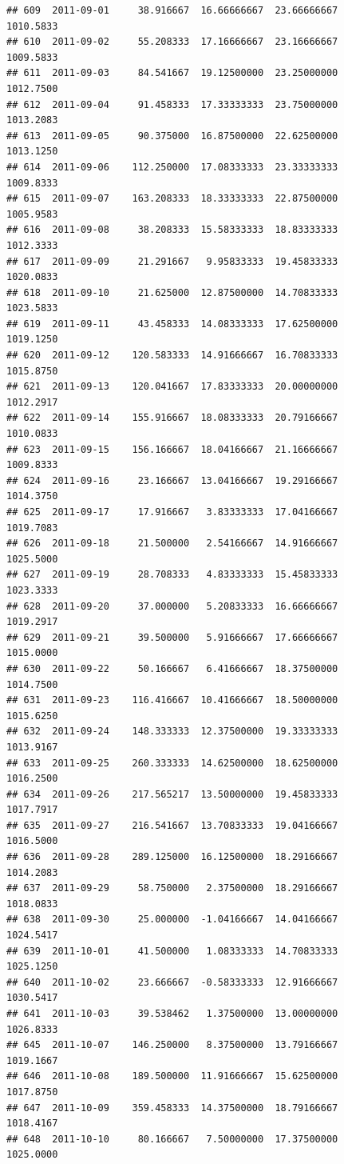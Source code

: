 \documentclass[
]{article}
\begin{document}
\begin{verbatim}
## 609  2011-09-01     38.916667  16.66666667  23.66666667    1010.5833
## 610  2011-09-02     55.208333  17.16666667  23.16666667    1009.5833
## 611  2011-09-03     84.541667  19.12500000  23.25000000    1012.7500
## 612  2011-09-04     91.458333  17.33333333  23.75000000    1013.2083
## 613  2011-09-05     90.375000  16.87500000  22.62500000    1013.1250
## 614  2011-09-06    112.250000  17.08333333  23.33333333    1009.8333
## 615  2011-09-07    163.208333  18.33333333  22.87500000    1005.9583
## 616  2011-09-08     38.208333  15.58333333  18.83333333    1012.3333
## 617  2011-09-09     21.291667   9.95833333  19.45833333    1020.0833
## 618  2011-09-10     21.625000  12.87500000  14.70833333    1023.5833
## 619  2011-09-11     43.458333  14.08333333  17.62500000    1019.1250
## 620  2011-09-12    120.583333  14.91666667  16.70833333    1015.8750
## 621  2011-09-13    120.041667  17.83333333  20.00000000    1012.2917
## 622  2011-09-14    155.916667  18.08333333  20.79166667    1010.0833
## 623  2011-09-15    156.166667  18.04166667  21.16666667    1009.8333
## 624  2011-09-16     23.166667  13.04166667  19.29166667    1014.3750
## 625  2011-09-17     17.916667   3.83333333  17.04166667    1019.7083
## 626  2011-09-18     21.500000   2.54166667  14.91666667    1025.5000
## 627  2011-09-19     28.708333   4.83333333  15.45833333    1023.3333
## 628  2011-09-20     37.000000   5.20833333  16.66666667    1019.2917
## 629  2011-09-21     39.500000   5.91666667  17.66666667    1015.0000
## 630  2011-09-22     50.166667   6.41666667  18.37500000    1014.7500
## 631  2011-09-23    116.416667  10.41666667  18.50000000    1015.6250
## 632  2011-09-24    148.333333  12.37500000  19.33333333    1013.9167
## 633  2011-09-25    260.333333  14.62500000  18.62500000    1016.2500
## 634  2011-09-26    217.565217  13.50000000  19.45833333    1017.7917
## 635  2011-09-27    216.541667  13.70833333  19.04166667    1016.5000
## 636  2011-09-28    289.125000  16.12500000  18.29166667    1014.2083
## 637  2011-09-29     58.750000   2.37500000  18.29166667    1018.0833
## 638  2011-09-30     25.000000  -1.04166667  14.04166667    1024.5417
## 639  2011-10-01     41.500000   1.08333333  14.70833333    1025.1250
## 640  2011-10-02     23.666667  -0.58333333  12.91666667    1030.5417
## 641  2011-10-03     39.538462   1.37500000  13.00000000    1026.8333
## 645  2011-10-07    146.250000   8.37500000  13.79166667    1019.1667
## 646  2011-10-08    189.500000  11.91666667  15.62500000    1017.8750
## 647  2011-10-09    359.458333  14.37500000  18.79166667    1018.4167
## 648  2011-10-10     80.166667   7.50000000  17.37500000    1025.0000

\end{verbatim}
\end{document}
